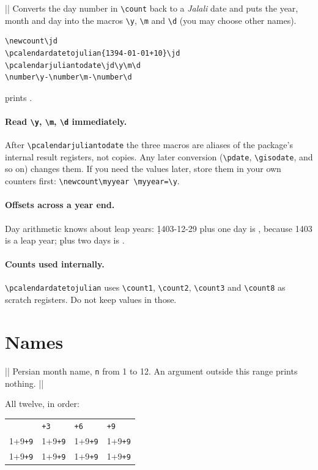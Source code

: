\documentclass[11pt]{article}
\newcommand\iso[1]{\lr{#1}}            %
\newcommand\cs[1]{\texttt{\textbackslash #1}}
\newcommand\gap{\par\smallskip}
\newcommand\mc[1]{\edef\mm{\number\numexpr#1\relax}\texttt{\mm}\quad\pcalendarmonthname{\mm}}
\newcommand\MROW[1]{\mc{#1}&\mc{#1+3}&\mc{#1+6}&\mc{#1+9}}
\begin{document}
\macro|\pcalendarjuliantodate{\count}{\y}{\m}{\d}|
Converts the day number in \cs{count} back to a \emph{Jalali} date and puts the year, month and day
into the macros \cs{y}, \cs{m} and \cs{d} (you may choose other names).

\begin{verbatim}
\newcount\jd
\pcalendardatetojulian{1394-01-01+10}\jd
\pcalendarjuliantodate\jd\y\m\d
\number\y-\number\m-\number\d
\end{verbatim}
\jd%
\pcalendarjuliantodate\jd\y\m\d%
prints \iso{\number\y-\number\m-\number\d}.

\paragraph{Read \cs{y}, \cs{m}, \cs{d} immediately.} After \cs{pcalendarjuliantodate} the three macros
are aliases of the package's internal result registers, not copies. Any later conversion
(\cs{pdate}, \cs{gisodate}, and so on) changes them. If you need the values later, store them in your
own counters first: \texttt{\cs{newcount}\cs{myyear}\ \cs{myyear=\cs{y}}}.

\paragraph{Offsets across a year end.} Day arithmetic knows about leap years:
\jd\pcalendarjuliantodate\jd\y\m\d%
1403-12-29 plus one day is \iso{\number\y-\number\m-\number\d}, because 1403 is a leap year;
\jd\pcalendarjuliantodate\jd\y\m\d%
plus two days is \iso{\number\y-\number\m-\number\d}.

\paragraph{Counts used internally.} \cs{pcalendardatetojulian} uses \cs{count1}, \cs{count2},
\cs{count3} and \cs{count8} as scratch registers. Do not keep values in those.

\section{Names}\label{sec:names6}

\macro||
Persian month name, \texttt{n} from 1 to 12. An argument outside this range prints nothing.
\ex||{}
\gap
All twelve, in order:\gap
\gap
\begin{tabular}{llll}
\MROW{1}\\
\MROW{2}\\
\MROW{3}
\end{tabular}
\end{document}
